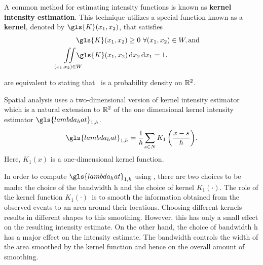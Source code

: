 A common method for estimating \gls{intensity} functions is known as
\textbf{\gls{kernel intensity estimation}}.
This technique utilizes a special function known as a \textbf{\gls{kernel}},
denoted by $\gls{K}\xvec$,
that satisfies
\begin{align}
    & \hspace{1.75em} \gls{K}\xvec \ge 0~ \forall \xvec \in W, \text{and} \label{eq:k_pos} \\%
    & \iintW{\gls{K}\xvec} = 1 \text{.} \label{eq:k_1}%
\end{align}

 are equivalent to stating that \Kdots~is a probability density on $\mathbb{R}^2$.

Spatial analysis uses a two-dimensional version of \gls{kernel intensity estimator}
which is a natural extension to $\mathbb{R}^2$ of the one dimensional \gls{kernel intensity estimator} $\gls{lambda_hat}_{1,h}$.
\begin{equation}
    \label{eq:lambda_hat_1}
    \gls{lambda_hat}_{1,h} = \sumSone{K_1\left( \frac{x - s}{h} \right)} \text{.}%
\end{equation}
Here, $K_1(x)$ is a one-dimensional kernel function.

In order to compute $\gls{lambda_hat}_{1,h}$ using ,
there are two choices to be made: the choice of the bandwidth \gls{h}
and the choice of \gls{kernel} $K_1(\cdot)$.
The role of the \gls{kernel} function $K_1(\cdot)$~is to smooth the information obtained
from the observed \glspl{event} to an area around their locations.
Choosing different \glspl{kernel} results in different shapes to this smoothing.
However, this has only a small effect on the resulting \gls{intensity} estimate.
On the other hand,
the choice of bandwidth \gls{h} has a major effect on the \gls{intensity} estimate.
The bandwidth controls the width of the area smoothed by the \gls{kernel} function and hence on the overall amount of smoothing.

